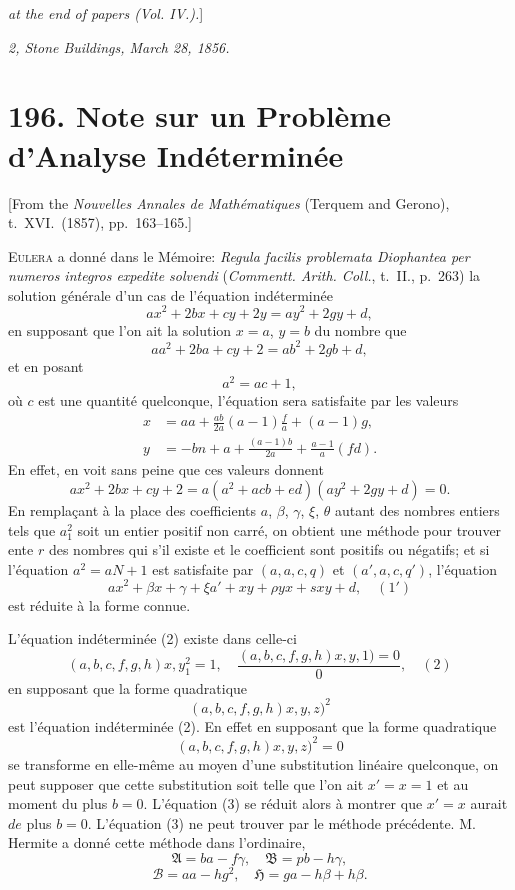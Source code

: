 \documentclass[11pt,a4paper]{book}
\begin{document}
\medskip

\noindent[\textit{See} [298] \textit{at the end of papers (Vol. IV.).}]

\bigskip

\noindent\textit{2, Stone Buildings, March 28, 1856.}

\newpage


\section*{196. Note sur un Probl\`eme d'Analyse Ind\'etermin\'ee}

\begin{center}
[From the \textit{Nouvelles Annales de Math\'ematiques} (Terquem and Gerono), t.~XVI.~(1857),
pp.~163--165.]
\end{center}

\bigskip

E\textsc{ulera} a donn\'e dans le M\'emoire: \textit{Regula facilis problemata Diophantea per numeros
integros expedite solvendi} (\textit{Commentt. Arith. Coll.}, t.~II., p.~263) la solution g\'en\'erale d'un cas
de l'\'equation ind\'etermin\'ee
\[
ax^2 + 2bx + cy + 2y = ay^2 + 2gy + d,
\]
en supposant que l'on ait la solution $x = a$, $y = b$ du nombre que
\[
aa^2 + 2ba + cy + 2 = ab^2 + 2gb + d,
\]
et en posant
\[
a^2 = ac + 1,
\]
o\`u $c$ est une quantit\'e quelconque, l'\'equation sera satisfaite par les valeurs
\begin{align*}
x &= aa + \frac{ab}{2a}(a-1)\frac{f}{a} + (a-1)g,\\
y &= -bn + a + \frac{(a-1)b}{2a} + \frac{a-1}{a}(fd).
\end{align*}
En effet, en voit sans peine que ces valeurs donnent
\[
ax^2 + 2bx + cy + 2 = a(a^2 + acb + ed) (ay^2 + 2gy + d) = 0.
\]
En rempla\c{c}ant \`a la place des coefficients $a$, $\beta$, $\gamma$, $\xi$, $\theta$ autant des nombres entiers
tels que $a_1^2$ soit un entier positif non carr\'e, on obtient une m\'ethode pour trouver
ente $r$ des nombres qui s'il existe et le coefficient sont positifs ou n\'egatifs; et si l'\'equation
$a^2 = aN + 1$ est satisfaite par $(a, a, c, q)$ et $(a', a, c, q')$, l'\'equation
\[
ax^2 + \beta x + \gamma + \xi a' + xy + \rho yx + s xy + d, \quad (1')
\]
est r\'eduite \`a la forme connue.

L'\'equation ind\'etermin\'ee (2) existe dans celle-ci
\[
(a, b, c, f, g, h)x, y_1^2 = 1, \quad \frac{(a, b, c, f, g, h)x, y, 1) = 0}{0}, \quad (2)
\]
en supposant que la forme quadratique
\[
(a, b, c, f, g, h)x, y, z)^2
\]
est l'\'equation ind\'etermin\'ee (2). En effet en supposant que la forme quadratique
\[
(a, b, c, f, g, h)x, y, z)^2 = 0
\]
se transforme en elle-m\^eme au moyen d'une substitution lin\'eaire quelconque, on peut
supposer que cette substitution soit telle que l'on ait
$x' = x = 1$ et au moment du plus $b = 0$. L'\'equation (3) se r\'eduit alors \`a montrer
que $x' = x$ aurait $de$ plus $b = 0$. L'\'equation (3) ne peut trouver par le m\'ethode pr\'ec\'edente. M. Hermite
a donn\'e cette m\'ethode dans l'ordinaire,
\[
\mathfrak{A} = ba - f\gamma, \quad \mathfrak{B} = pb - h\gamma,
\]
\[
\mathcal{B} = aa - hg^2, \quad \mathfrak{H} = ga - h\beta + h\beta.
\]
\end{document}
